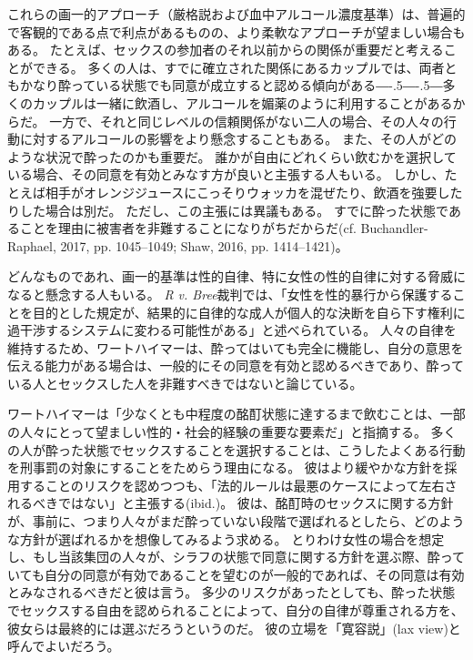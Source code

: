 \documentclass[paper=a4,book,openany]{jlreq}
\def\DDASH{―\kern-.5\zw―\kern-.5\zw―} %
\begin{document}
これらの画一的アプローチ（厳格説および血中アルコール濃度基準）は、普遍的で客観的である点で利点があるものの、より柔軟なアプローチが望ましい場合もある。
たとえば、セックスの参加者のそれ以前からの関係が重要だと考えることができる。
多くの人は、すでに確立された関係にあるカップルでは、両者ともかなり酔っている状態でも同意が成立すると認める傾向がある{\DDASH}多くのカップルは一緒に飲酒し、アルコールを媚薬のように利用することがあるからだ。
一方で、それと同じレベルの信頼関係がない二人の場合、その人々の行動に対するアルコールの影響をより懸念することもある。
また、その人がどのような状況で酔ったのかも重要だ。
誰かが自由にどれくらい飲むかを選択している場合、その同意を有効とみなす方が良いと主張する人もいる。
しかし、たとえば相手がオレンジジュースにこっそりウォッカを混ぜたり、飲酒を強要したりした場合は別だ。
ただし、この主張には異議もある。
すでに酔った状態であることを理由に被害者を非難することになりがちだからだ(cf. Buchandler-Raphael, 2017, pp. 1045--1049; Shaw, 2016, pp. 1414--1421)\nocite{buchhandler-raphael17:_conun_volun_intox_sex}\nocite{shaw16:_title_ix_sexual_assaul_issue_effec_consen}。

どんなものであれ、画一的基準は性的自律、特に女性の性的自律に対する脅威になると懸念する人もいる。
\emph{R v. Bree}裁判では、「女性を性的暴行から保護することを目的とした規定が、結果的に自律的な成人が個人的な決断を自ら下す権利に過干渉するシステムに変わる可能性がある」と述べられている。
人々の自律を維持するため、ワートハイマーは、酔ってはいても完全に機能し、自分の意思を伝える能力がある場合は、一般的にその同意を有効と認めるべきであり、酔っている人とセックスした人を非難すべきではないと論じている。

ワートハイマーは「少なくとも中程度の酩酊状態に達するまで飲むことは、一部の人々にとって望ましい性的・社会的経験の重要な要素だ」と指摘する\citep[p. 251]{wertheimer03:_consen_sexual_relat}。
多くの人が酔った状態でセックスすることを選択することは、こうしたよくある行動を刑事罰の対象にすることをためらう理由になる。
彼はより緩やかな方針を採用することのリスクを認めつつも、「法的ルールは最悪のケースによって左右されるべきではない」と主張する(ibid.)。
彼は、酩酊時のセックスに関する方針が、事前に、つまり人々がまだ酔っていない段階で選ばれるとしたら、どのような方針が選ばれるかを想像してみるよう求める。
とりわけ女性の場合を想定し、もし当該集団の人々が、シラフの状態で同意に関する方針を選ぶ際、酔っていても自分の同意が有効であることを望むのが一般的であれば、その同意は有効とみなされるべきだと彼は言う。
多少のリスクがあったとしても、酔った状態でセックスする自由を認められることによって、自分の自律が尊重される方を、彼女らは最終的には選ぶだろうというのだ。
彼の立場を「寛容説」(lax view)と呼んでよいだろう。
\end{document}
